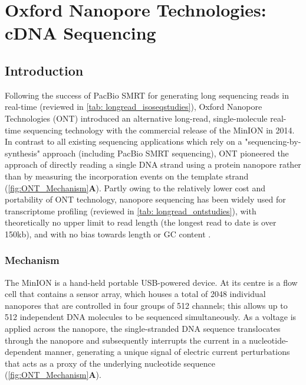 \clearpage

\section{Oxford Nanopore Technologies: cDNA Sequencing}
\label{sec:ONT_cDNA_Sequencing}

\subsection{Introduction}
Following the success of PacBio SMRT for generating long sequencing reads in real-time (reviewed in \cref{tab: longread_isoseqstudies}), Oxford Nanopore Technologies (ONT) introduced an alternative long-read, single-molecule real-time sequencing technology with the commercial release of the MinION in 2014. In contrast to all existing sequencing applications which rely on a "sequencing-by-synthesis" approach (including PacBio SMRT sequencing), ONT pioneered the approach of directly reading a single DNA strand using a protein nanopore rather than by measuring the incorporation events on the template strand\cite{Jain2015} (\cref{fig:ONT_Mechanism}\textbf{A}). Partly owing to the relatively lower cost and portability of ONT technology, nanopore sequencing has been widely used for transcriptome profiling (reviewed in \cref{tab: longread_ontstudies}), 
with theoretically no upper limit to read length \cite{Loman2015} (the longest read to date is over 150kb), and with no bias towards length or GC content \cite{Oikonomopoulos2016, Weirather2017}.


\subsubsection{Mechanism}
The MinION is a hand-held portable USB-powered device. At its centre is a flow cell that contains a sensor array, which houses a total of 2048 individual nanopores that are controlled in four groups of 512 channels; this allows up to 512 independent DNA molecules to be sequenced simultaneously\cite{Jain2015}. As a voltage is applied across the nanopore, the single-stranded DNA sequence translocates through the nanopore and subsequently interrupts the current in a nucleotide-dependent manner, generating a unique signal of electric current perturbations that acts as a proxy of the underlying nucleotide sequence (\cref{fig:ONT_Mechanism}\textbf{A}). 

